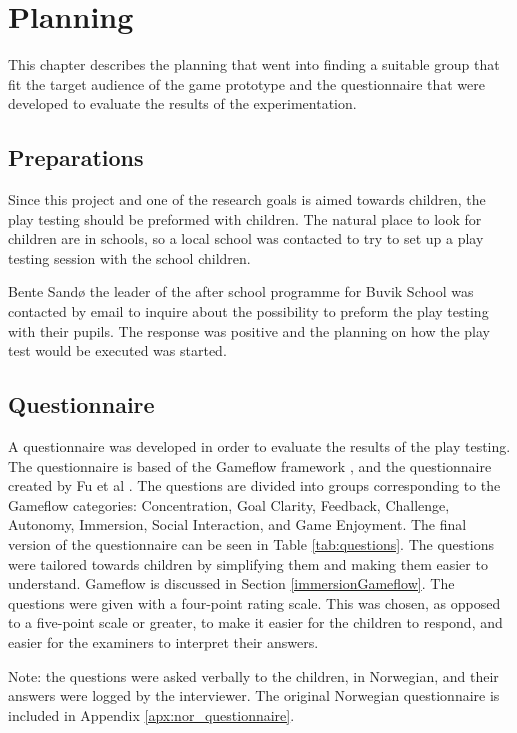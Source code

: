 \chapter{Planning}
This chapter describes the planning that went into finding a suitable group that fit the target audience of the game prototype and the questionnaire that were developed to evaluate the results of the experimentation.


\section{Preparations}
Since this project and one of the research goals is aimed towards children, the play testing should be preformed with children. The natural place to look for children are in schools, so a local school was contacted to try to set up a play testing session with the school children.

Bente Sandø the leader of the after school programme for Buvik School was contacted by email to inquire about the possibility to preform the play testing with their pupils. The response was positive and the planning on how the play test would be executed was started.


\section{Questionnaire}
\label{sec:questionnaire}
A questionnaire was developed in order to evaluate the results of the play testing. The questionnaire is based of the Gameflow framework \cite{sweetser2005gameflow}, and the questionnaire created by Fu et al \cite{fu2009egameflow}. The questions are divided into groups corresponding to the Gameflow categories: Concentration, Goal Clarity, Feedback, Challenge, Autonomy, Immersion, Social Interaction, and Game Enjoyment. The final version of the questionnaire can be seen in Table \ref{tab:questions}. The questions were tailored towards children by simplifying them and making them easier to understand. Gameflow is discussed in Section \ref{immersionGameflow}. The questions were given with a four-point rating scale. This was chosen, as opposed to a five-point scale or greater, to make it easier for the children to respond, and easier for the examiners to interpret their answers.

Note: the questions were asked verbally to the children, in Norwegian, and their answers were logged by the interviewer. The original Norwegian questionnaire is included in Appendix \ref{apx:nor_questionnaire}.

